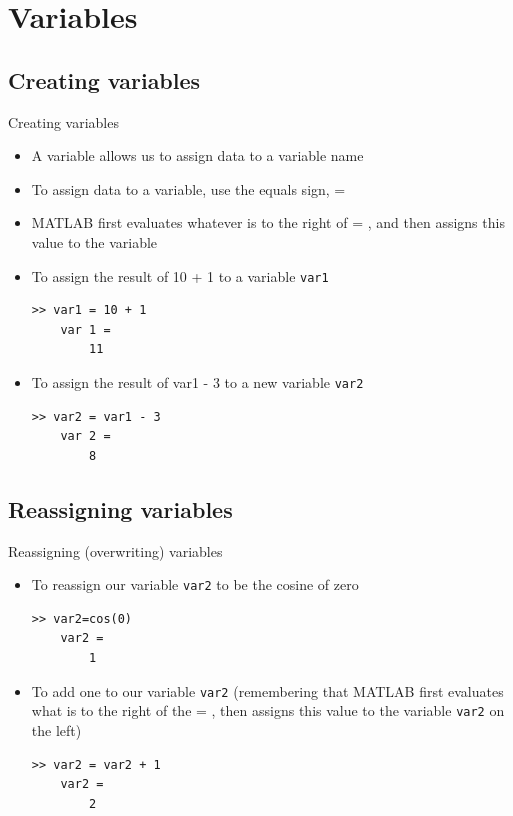 \documentclass{beamer}
\begin{document}
\section{Variables}
\subsection{Creating variables}
\begin{frame}[fragile]{Creating variables}
	\begin{itemize}
		\item A variable allows us to assign data to a variable name
		\item To assign data to a variable, use the equals sign, =
		\item MATLAB first evaluates whatever is to the right of = , and then assigns this value to the variable
		\item To assign the result of 10 + 1 to a variable \texttt{var1}
		\begin{lstlisting}[style=Matlab-editor]
	>> var1 = 10 + 1
	var 1 = 
		11
		\end{lstlisting}
		\item To assign the result of var1 - 3 to a new variable \texttt{var2}
		\begin{lstlisting}[style=Matlab-editor]
	>> var2 = var1 - 3
	var 2 = 
		8
		\end{lstlisting}
	\end{itemize}
\end{frame}

\subsection{Reassigning variables}
\begin{frame}[fragile]{Reassigning (overwriting) variables}
	\begin{itemize}
		\item To reassign our variable \texttt{var2} to be the cosine of zero
		\begin{lstlisting}[style=Matlab-editor]
	>> var2=cos(0)
	var2 = 
		1
		\end{lstlisting}
		\item To add one to our variable \texttt{var2} (remembering that MATLAB first evaluates what is to the right of the  = , then assigns this value to the variable \texttt{var2} on the left)
		\begin{lstlisting}[style=Matlab-editor]
	>> var2 = var2 + 1
	var2 = 
		2
		\end{lstlisting}
	\end{itemize}
\end{frame}
\end{document}
